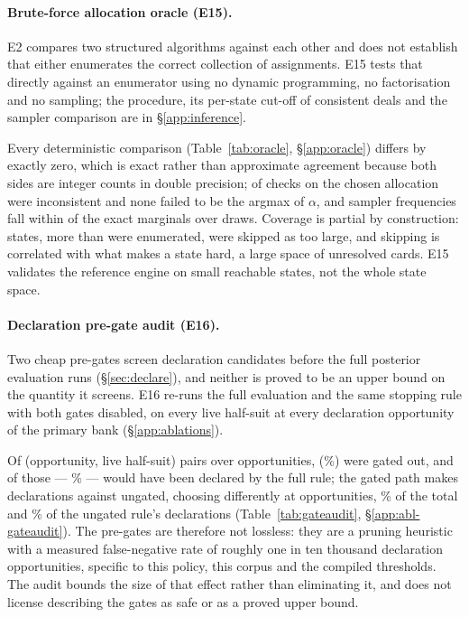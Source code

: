 \paragraph{Brute-force allocation oracle (E15).}
E2 compares two structured algorithms against each other and does not establish
that either enumerates the correct collection of assignments. E15 tests that
directly against an enumerator using no dynamic programming, no factorisation and
no sampling; the procedure, its per-state cut-off of \numOracleMaxDeals{}
consistent deals and the sampler comparison are in \S\ref{app:inference}.


Every deterministic comparison (Table~\ref{tab:oracle}, \S\ref{app:oracle}) differs by exactly zero,
which is exact rather than approximate agreement because both sides are integer
counts in double precision; of \numOracleBestChecks{} checks on the chosen
allocation \numOracleBestBad{} were inconsistent and none failed to be the argmax
of $\alpha$, and sampler frequencies fall within \numOracleSampleDiff{} of the
exact marginals over \numOracleDraws{} draws. Coverage is partial by construction: \numOracleStatesSkipped{} states,
more than were enumerated, were skipped as too large, and skipping is correlated
with what makes a state hard, a large space of unresolved cards. E15 validates
the reference engine on small reachable states, not the whole state space.

\paragraph{Declaration pre-gate audit (E16).}
Two cheap pre-gates screen declaration candidates before the full posterior
evaluation runs (\S\ref{sec:declare}), and neither is proved to be an upper bound
on the quantity it screens. E16 re-runs the full evaluation and the same stopping
rule with both gates disabled, on every live half-suit at every declaration
opportunity of the primary bank (\S\ref{app:ablations}).


Of \numGateSeen{} (opportunity, live half-suit) pairs over \numGateOpps{}
opportunities, \numGateRejected{} (\numGateRejectedPct\%) were gated out, and
\numGateFalseNeg{} of those --- \numGateFalseNegPct\% --- would have been
declared by the full rule; the gated path makes \numGateDeclGated{} declarations
against \numGateDeclUngated{} ungated, choosing differently at
\numGateActionsChanged{} opportunities, \numGateActionsPct\% of the total and
\numGateDeclLostPct\% of the ungated rule's declarations
(Table~\ref{tab:gateaudit}, \S\ref{app:abl-gateaudit}). The pre-gates are
therefore not lossless: they are a pruning heuristic with a measured
false-negative rate of roughly one in ten thousand declaration opportunities,
specific to this policy, this corpus and the compiled thresholds. The audit
bounds the size of that effect rather than eliminating it, and does not license
describing the gates as safe or as a proved upper bound.

